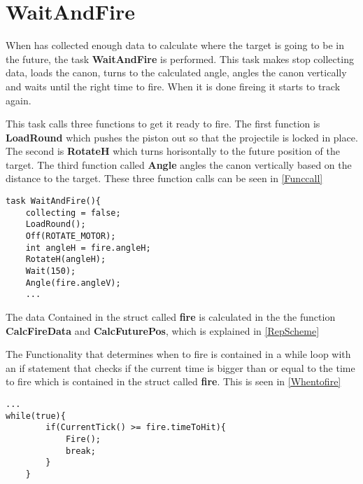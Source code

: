 \section{WaitAndFire}
When \name has collected enough data to calculate where the target is going to
be in the future, the task \textbf{WaitAndFire} is performed. This task makes
\name stop collecting data, loads the canon, turns to the calculated angle, angles the
canon vertically and waits until the right time to fire. When it is done fireing
it starts to track again.\nl

This task calls three functions to get it ready to fire. The first function is
\textbf{LoadRound} which pushes the piston out so that the projectile is locked
in place. The second is \textbf{RotateH} which turns \name horisontally to the
future position of the target. The third function called \textbf{Angle} angles
the canon vertically based on the distance to the target. These three function calls can be seen in
\autoref{Funccall}\nl

\begin{minipage}[H]{\linewidth}
\begin{lstlisting}[caption = Function calls in WaitAndFire, label = Funccall,
style = nc] 
task WaitAndFire(){
    collecting = false;
    LoadRound();
    Off(ROTATE_MOTOR);
    int angleH = fire.angleH;
    RotateH(angleH);
    Wait(150);
    Angle(fire.angleV);
    ...
\end{lstlisting}
\end{minipage}

The data Contained in the struct called \textbf{fire} is calculated in the the
function \textbf{CalcFireData} and \textbf{CalcFuturePos}, which is explained in
\autoref{RepScheme}

The Functionality that determines when to fire is contained in a while loop with
an if statement that checks if the current time is bigger than or equal to the
time to fire which is contained in the struct called \textbf{fire}. This is seen
in \autoref{Whentofire}\nl
 
\begin{minipage}[H]{\linewidth}
\begin{lstlisting}[caption = While loop that determines when to fire, label =
Whentofire, style = nc] ...
while(true){
        if(CurrentTick() >= fire.timeToHit){
            Fire();
            break;
        }
    }
\end{lstlisting}
\end{minipage}






